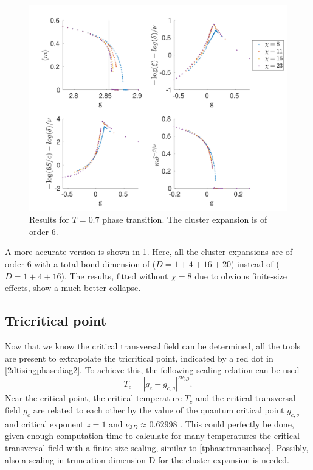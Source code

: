 \begin{figure}[!htbp]
    \center
    \includegraphics[width=\textwidth]{Figuren/phasediag/t07/zoomed2.pdf}
    \caption{Results for $T=0.7$ phase transition. The cluster expansion is of order 6.}
    \label{fig:phase:t07:full2}
\end{figure}

A more accurate version is shown in \cref{fig:phase:t07:full2}. Here, all the cluster expansions are of order 6 with a total bond dimension of ($D = 1+4+16+20$) instead of ($D = 1+4+16$). The results, fitted without $\chi=8$ due to obvious finite-size effects, show a much better collapse.

\subsection{Tricritical point}\label{subsec:tricrit}

Now that we know the critical transversal field can be determined, all the tools are present to extrapolate the tricritical point, indicated by a red dot in \cref{2dtisingphasediag2}. To achieve this, the following scaling relation can be used
\begin{equation}
    T_c = \left| g_c-g_{c,q} \right|^{z \nu_{3D}} .
\end{equation}
Near the critical point, the critical temperature $T_c$ and the critical transversal field $g_c$ are related to each other by the value of the quantum critical point $g_{c,q}$ and critical exponent $z=1$ and $\nu_{3D} \approx 0.62998$ \cite{Hesselmann2016}. This could perfectly be done, given enough computation time to calculate for many temperatures the critical transversal field with a finite-size scaling, similar to \cref{tphasetranssubsec}. Possibly, also a scaling in truncation dimension D for the cluster expansion is needed.

